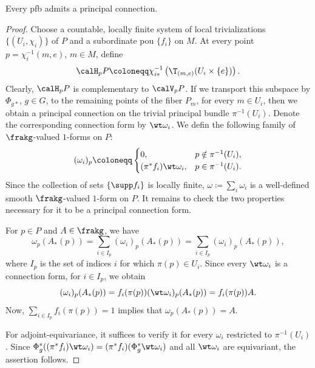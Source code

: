 \begin{prop}
    Every \gls{pfb} admits a principal connection.
\end{prop}
\begin{proof}
    Choose a countable, locally finite system of local trivializations $\{(U_i,\chi_i)\}$ of $P$ and a subordinate \gls{pou} $\{f_i\}$ on $M$. At every point $p=\chi_i^{-1}(m,e)$, $m\in M$, define
    \[\calH_pP\coloneqq \chi_{i\ast}^{-1} \left(\T_{(m,e)}(U_i\times\{e\})\right).\]
    Clearly, $\calH_pP$ is complementary to $\calV_pP$. If we transport this subspace by $\Phi_{g\ast}$, $g\in G$, to the remaining points of the fiber $P_m$, for every $m\in U_i$, then we obtain a principal connection on the trivial principal bundle $\pi^{-1}(U_i)$. Denote the corresponding connection form by $\wt\omega_i$. We defin the following family of $\frakg$-valued $1$-forms on $P$:
    \[(\omega_i)_p\coloneqq 
    \begin{cases}
        0,&p\notin \pi^{-1}(U_i),\\
        (\pi^\ast f_i)\wt\omega_i, & p\in\pi^{-1}(U_i).
    \end{cases}
    \]
    Since the collection of sets $\{\supp f_i\}$ is locally finite, $\omega\coloneqq\sum_i \omega_i$ is a well-defined smooth $\frakg$-valued $1$-form on $P$. It remains to check the two properties necessary for it to be a principal connection form.

    For $p\in P$ and $A\in\frakg$, we have
    \[\omega_p(A_\ast(p))=\sum_{i\in I_p} (\omega_i)_p(A_\ast(p))=\sum_{i\in I_p} (\omega_i)_p(A_\ast(p)),\]
    where $I_p$ is the set of indices $i$ for which $\pi(p)\in U_i$. Since every $\wt\omega_i$ is a connection form, for $i\in I_p$, we obtain
    \[(\omega_i)_p(A_\ast(p))=f_i(\pi(p))(\wt\omega_i)_p(A_\ast(p))=f_i(\pi(p))A.\]
    Now, $\sum_{i\in I_p} f_i(\pi(p))=1$ implies that $\omega_p(A_\ast(p))=A$.

    For adjoint-equivariance, it suffices to verify it for every $\omega_i$ restricted to $\pi^{-1}(U_i)$. Since  $\Phi_g^\ast((\pi^\ast f_i)\wt\omega_i)=(\pi^\ast f_i)(\Phi_g^\ast \wt\omega_i)$ and all $\wt\omega_i$ are equivariant, the assertion follows.
\end{proof}

